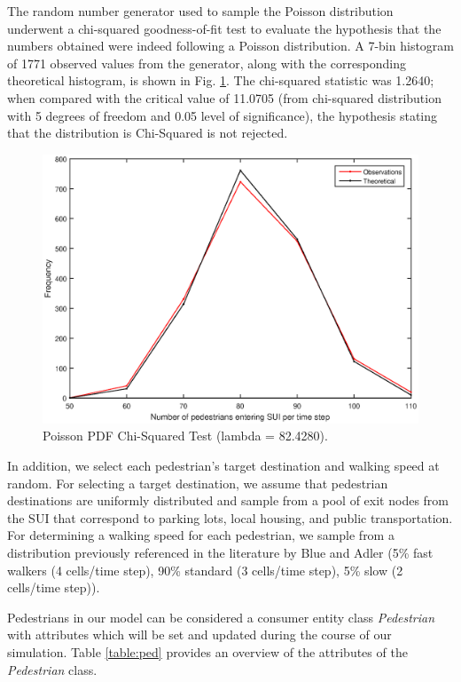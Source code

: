 \documentclass[12pt]{article}
\begin{document}
The random number generator used to sample the Poisson distribution underwent a
chi-squared goodness-of-fit test to evaluate the hypothesis that the numbers obtained
were indeed following a Poisson distribution. A 7-bin histogram of 1771 observed
values from the generator, along with the corresponding theoretical histogram,
is shown in Fig. \ref{fig:poissoncompare}. The chi-squared statistic was 1.2640;
when compared with the critical value of 11.0705 (from chi-squared distribution
with 5 degrees of freedom and 0.05 level of significance), the hypothesis
stating that the distribution is Chi-Squared is not rejected.

\begin{figure}[H]
  \includegraphics[width=\linewidth,natwidth=811,natheight=512]{PoissonCompare.eps}
  \caption{Poisson PDF Chi-Squared Test (lambda = 82.4280).}
  \label{fig:poissoncompare}
\end{figure}

In addition, we select each pedestrian's target destination and walking
speed at random. For selecting a target destination, we assume that pedestrian
destinations are uniformly distributed and sample from a pool of exit nodes
from the SUI that correspond to parking lots, local housing, and public
transportation. For determining a walking speed for each pedestrian, we sample
from a distribution previously referenced in the literature by Blue and Adler
\cite{blue2001cellular} (5\% fast walkers (4 cells/time step), 90\% standard
(3 cells/time step), 5\% slow (2 cells/time step)).

Pedestrians in our model can be considered a consumer entity class
\textit{Pedestrian} with attributes which will be set and updated during the
course of our simulation. Table \ref{table:ped} provides an overview of the
attributes of the \textit{Pedestrian} class.
\end{document}
